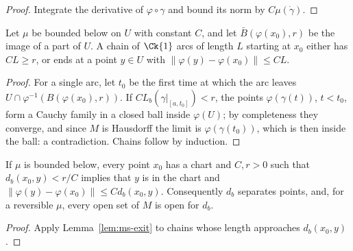 \begin{proof}
  \leanok
  Integrate the derivative of $\varphi \circ \gamma$ and bound its norm by $C \mu(\dot\gamma)$.
\end{proof}

\begin{lemma}
  \label{lem:ms-exit}
  \leanok
  Let $\mu$ be bounded below on $U$ with constant $C$, and let $\bar B(\varphi(x_0), r)$ be the
  image of a part of $U$. A chain of $\Ck{1}$ arcs of length $L$ starting at $x_0$ either has
  $C L \geq r$, or ends at a point $y \in U$ with $\|\varphi(y) - \varphi(x_0)\| \leq C L$.
\end{lemma}

\begin{proof}
  \leanok
  For a single arc, let $t_0$ be the first time at which the arc leaves
  $U \cap \varphi^{-1}(B(\varphi(x_0), r))$. If $C L_b(\gamma|_{[a, t_0]}) < r$, the points
  $\varphi(\gamma(t))$, $t < t_0$, form a Cauchy family in a closed ball inside $\varphi(U)$; by
  completeness they converge, and since $M$ is Hausdorff the limit is $\varphi(\gamma(t_0))$, which
  is then inside the ball: a contradiction. Chains follow by induction.
\end{proof}

\begin{theorem}
  \label{thm:ms-bounded-below}
  \leanok
  If $\mu$ is bounded below, every point $x_0$ has a chart and $C, r > 0$ such that
  $d_b(x_0, y) < r / C$ implies that $y$ is in the chart and
  $\|\varphi(y) - \varphi(x_0)\| \leq C d_b(x_0, y)$. Consequently $d_b$ separates points, and, for
  a reversible $\mu$, every open set of $M$ is open for $d_b$.
\end{theorem}

\begin{proof}
  \leanok
  Apply Lemma~\ref{lem:ms-exit} to chains whose length approaches $d_b(x_0, y)$.
\end{proof}

